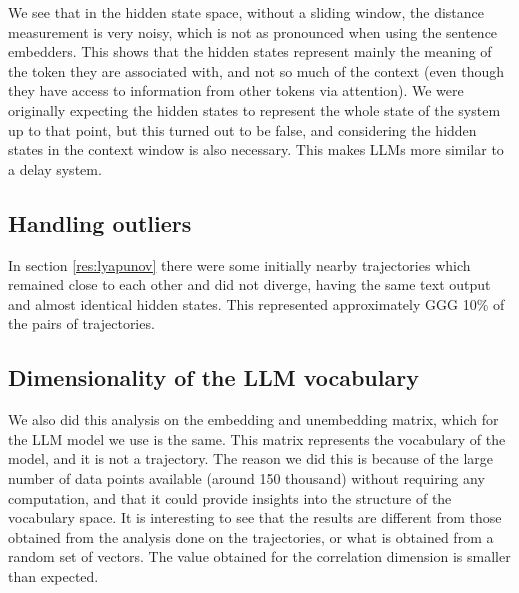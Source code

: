 \documentclass[a4paper,12pt]{article}
\begin{document}
We see that in the hidden state space, without a sliding window, the distance measurement is very noisy, which is not as pronounced when using the sentence embedders. This shows that the hidden states represent mainly the meaning of the token they are associated with, and not so much of the context (even though they have access to information from other tokens via attention). 
We were originally expecting the hidden states to represent the whole state of the system up to that point, but this turned out to be false, and considering the hidden states in the context window is also necessary. This makes LLMs more similar to a delay system. %


\subsection{Handling outliers} %
\label{subsec:appendix_handling_outliers}

In section \ref{res:lyapunov} there were some initially nearby trajectories which remained close to each other and did not diverge, having the same text output and almost identical hidden states. This represented approximately GGG 10\% of the pairs of trajectories.

\subsection{Dimensionality of the LLM vocabulary}
\label{subsec:appendix_vocab_dim}


We also did this analysis on the embedding and unembedding matrix, which for the LLM model we use is the same. This matrix represents the vocabulary of the model, and it is not a trajectory. 
The reason we did this is because of the large number of data points available (around 150 thousand) without requiring any computation, and that it could provide insights into the structure of the vocabulary space. It is interesting to see that the results are different from those obtained from the analysis done on the trajectories, or what is obtained from a random set of vectors. The value obtained for the correlation dimension is smaller than expected.
\end{document}
